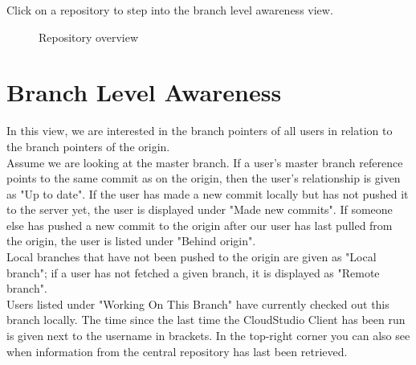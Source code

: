 Click on a repository to step into the branch level awareness view.



\begin{figure}[h!]
  \centering
  \caption{Repository overview}
  \label{fig:overview}
\end{figure}





\section{Branch Level Awareness}

In this view, we are interested in the branch pointers of all users in relation to the branch pointers of the origin. \\

Assume we are looking at the master branch. If a user's master branch reference points to the same commit as on the origin, then the user's relationship is given as "Up to date". If the user has made a new commit locally but has not pushed it to the server yet, the user is displayed under "Made new commits". If someone else has pushed a new commit to the origin after our user has last pulled from the origin, the user is listed under "Behind origin". \\

Local branches that have not been pushed to the origin are given as "Local branch"; if a user has not fetched a given branch, it is displayed as "Remote branch". \\

Users listed under "Working On This Branch" have currently checked out this branch locally. The time since the last time the CloudStudio Client has been run is given next to the username in brackets. In the top-right corner you can also see when information from the central repository has last been retrieved. \\

